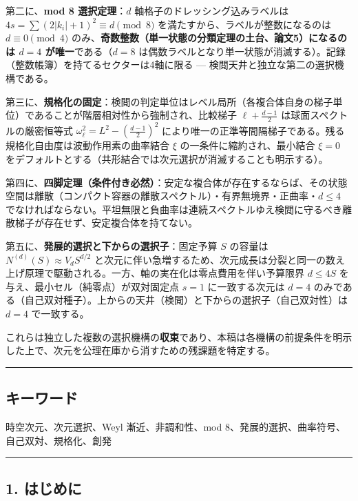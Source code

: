 \documentclass[
]{ltjsarticle}
\begin{document}
第二に、\textbf{mod 8 選択定理}：\(d\) 軸格子のドレッシング込みラベルは
\(4s=\sum(2|k_i|+1)^2\equiv d\pmod 8\)
を満たすから、ラベルが整数になるのは \(d\equiv0\pmod4\)
のみ、\textbf{奇数整数（単一状態の分類定理の土台、論文5）になるのは
\(d=4\) が唯一}である（\(d=8\)
は偶数ラベルとなり単一状態が消滅する）。記録（整数帳簿）を持てるセクターは4軸に限る
--- 検閲天井と独立な第二の選択機構である。

第三に、\textbf{規格化の固定}：検閲の判定単位はレベル局所（各複合体自身の梯子単位）であることが階層相対性から強制され、比較梯子
\(\ell+\tfrac{d-1}2\) は球面スペクトルの厳密恒等式
\(\omega_\ell^2=L^2-(\tfrac{d-1}2)^2\)
により唯一の正準等間隔梯子である。残る規格化自由度は波動作用素の曲率結合
\(\xi\) の一条件に縮約され、最小結合 \(\xi=0\)
をデフォルトとする（共形結合では次元選択が消滅することも明示する）。

第四に、\textbf{四脚定理（条件付き必然）}：安定な複合体が存在するならば、その状態空間は離散（コンパクト容器の離散スペクトル）・有界無境界・正曲率・\(d\le4\)
でなければならない。平坦無限と負曲率は連続スペクトルゆえ検閲に守るべき離散梯子が存在せず、安定複合体を持てない。

第五に、\textbf{発展的選択と下からの選択子}：固定予算 \(S\) の容量は
\(N^{(d)}(S)\approx V_d S^{d/2}\)
と次元に伴い急増するため、次元成長は分裂と同一の数え上げ原理で駆動される。一方、軸の実在化は零点費用を伴い予算限界
\(d\le4S\) を与え、最小セル（純零点）が双対固定点 \(s=1\)
に一致する次元は \(d=4\)
のみである（自己双対種子）。上からの天井（検閲）と下からの選択子（自己双対性）は
\(d=4\) で一致する。

これらは独立した複数の選択機構の\textbf{収束}であり、本稿は各機構の前提条件を明示した上で、次元を公理在庫から消すための残課題を特定する。

\begin{center}\rule{0.5\linewidth}{0.5pt}\end{center}

\subsection{キーワード}\label{ux30adux30fcux30efux30fcux30c9}

時空次元、次元選択、Weyl 漸近、非調和性、mod
8、発展的選択、曲率符号、自己双対、規格化、創発

\begin{center}\rule{0.5\linewidth}{0.5pt}\end{center}

\subsection{1. はじめに}\label{ux306fux3058ux3081ux306b}
\end{document}
